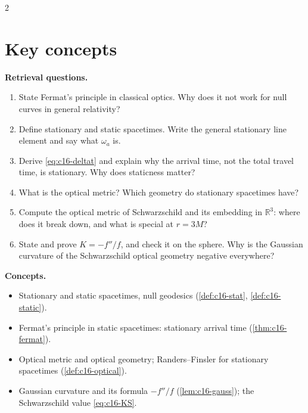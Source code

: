 \begin{paracol}{2}
\section*{Key concepts}
\begin{keyconcepts}
\textbf{Retrieval questions.}
\begin{enumerate}
  \item State Fermat's principle in classical optics. Why does it not work for null curves in general relativity?
  \item Define stationary and static spacetimes. Write the general stationary line element and say what $\omega_a$ is.
  \item Derive \eqref{eq:c16-deltat} and explain why the arrival time, not the total travel time, is stationary. Why does staticness matter?
  \item What is the optical metric? Which geometry do stationary spacetimes have?
  \item Compute the optical metric of Schwarzschild and its embedding in $\mathbb R^3$: where does it break down, and what is special at $r=3M$?
  \item State and prove $K=-f''/f$, and check it on the sphere. Why is the Gaussian curvature of the Schwarzschild optical geometry negative everywhere?
\end{enumerate}
\textbf{Concepts.}
\begin{itemize}
  \item Stationary and static spacetimes, null geodesics (\cref{def:c16-stat}, \cref{def:c16-static}).
  \item Fermat's principle in static spacetimes: stationary arrival time (\cref{thm:c16-fermat}).
  \item Optical metric and optical geometry; Randers--Finsler for stationary spacetimes (\cref{def:c16-optical}).
  \item Gaussian curvature and its formula $-f''/f$ (\cref{lem:c16-gauss}); the Schwarzschild value \eqref{eq:c16-KS}.
\end{itemize}
\end{keyconcepts}

\flushside
\end{paracol}

